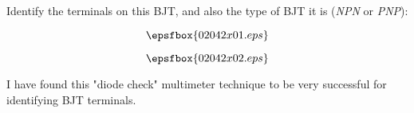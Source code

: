 

Identify the terminals on this BJT, and also the type of BJT it is ({\it NPN} or {\it PNP}):

$$\epsfbox{02042x01.eps}$$







$$\epsfbox{02042x02.eps}$$







I have found this "diode check" multimeter technique to be very successful for identifying BJT terminals.




